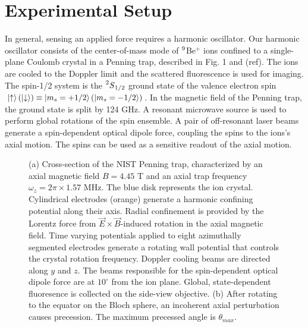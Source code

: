 \documentclass[aps,prl,twocolumn,groupedaddress]{revtex4-1}
\begin{document}
\section{Experimental Setup}
In general, sensing an applied force requires a harmonic oscillator. Our harmonic oscillator  consists of the center-of-mass mode of $\prescript{9}{}{}$Be$^{+}$ ions confined to a single-plane Coulomb crystal in a Penning trap, described in Fig. 1 and (ref). The ions are cooled to the Doppler limit and the scattered fluorescence is used for imaging. The spin-1/2 system is the $\prescript{2}{}{S}_{1/2}$ ground state of the valence electron spin $\ket{\uparrow} (\ket{\downarrow}) \equiv \ket{m_{s}=+1/2} (\ket{m_{s}=-1/2}) $. In the magnetic field of the Penning trap, the ground state is split by 124 GHz. A resonant microwave source is used to perform global rotations of the spin ensemble. A pair of off-resonant laser beams generate a spin-dependent optical dipole force, coupling the spins to the ions's axial motion. The spins can be used as a sensitive readout of the axial motion.
\begin{figure}
  \hfill
  \caption{(a) Cross-section of the NIST Penning trap, characterized by an axial magnetic field $B = 4.45$ T and an axial trap frequency $\omega_z = 2\pi \times 1.57$ MHz. The blue disk represents the ion crystal. Cylindrical electrodes (orange) generate a harmonic confining potential along their axis. Radial confinement is provided by the Lorentz force from $\vec{E} \times \vec{B}$-induced rotation in the axial magnetic field. Time varying potentials applied to eight azimuthally segmented electrodes generate a rotating wall potential that controls the crystal rotation frequency. Doppler cooling beams are directed along $y$ and $z$. The beams responsible for the spin-dependent optical dipole force are at $10^{\circ} $ from the ion plane. Global, state-dependent fluoresence is collected on the side-view objective. (b) After rotating to the equator on the Bloch sphere, an incoherent axial perturbation causes precession. The maximum precessed angle is $\theta_{max}$. }\label{fig:1}
\end{figure}
\end{document}
